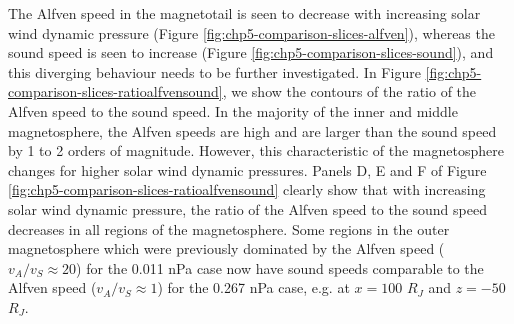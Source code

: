 The Alfven speed in the magnetotail is seen to decrease with increasing solar wind dynamic pressure (Figure \ref{fig:chp5-comparison-slices-alfven}), whereas the sound speed is seen to increase (Figure \ref{fig:chp5-comparison-slices-sound}), and this diverging behaviour needs to be further investigated. In Figure \ref{fig:chp5-comparison-slices-ratioalfvensound}, we show the contours of the ratio of the Alfven speed to the sound speed. In the majority of the inner and middle magnetosphere, the Alfven speeds are high and are larger than the sound speed by 1 to 2 orders of magnitude. However, this characteristic of the magnetosphere changes for higher solar wind dynamic pressures. Panels D, E and F of Figure \ref{fig:chp5-comparison-slices-ratioalfvensound} clearly show that with increasing solar wind dynamic pressure, the ratio of the Alfven speed to the sound speed decreases in all regions of the magnetosphere. Some regions in the outer magnetosphere which were previously dominated by the Alfven speed ($v_A/v_S \approx 20$) for the 0.011 nPa case now have sound speeds comparable to the Alfven speed ($v_A/v_S \approx 1$) for the 0.267 nPa case, e.g. at $x=100$ $R_J$ and $z=-50$ $R_J$. 

